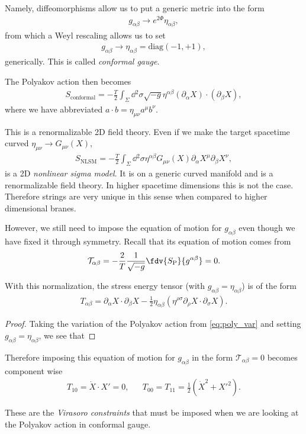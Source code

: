 Namely, diffeomorphisms allow us to put a generic metric into the form
\begin{align}
    g_{\alpha \beta} \to e^{2 \Phi} \eta_{\alpha \beta}
,\end{align}
from which a Weyl rescaling allows us to set
\begin{align}
    g_{\alpha \beta} \to \eta_{\alpha \beta} = \text{diag}\left( -1,+1 \right) 
,\end{align}
generically. This is called \emph{conformal gauge}. 

The Polyakov action then becomes
\begin{align}
    S_\text{conformal} = -\frac{T}{2} \int_{\Sigma} \dd{^2\sigma} \sqrt{-g}  \eta^{\alpha \beta} \left( \partial_\alpha X \right)  \cdot \left( \partial_\beta X \right) 
,\end{align}
where we have abbreviated $a\cdot b = \eta_{\mu \nu} a^{\mu} b^{\nu}$.

This is a renormalizable 2D field theory. Even if we make the target spacetime curved $\eta_{\mu \nu} \to G_{\mu \nu} \left( X \right) $,
\begin{align}
    S_\text{NLSM} = -\frac{T}{2} \int_{\Sigma} \dd{^2\sigma} \eta^{\alpha \beta} G_{\mu \nu} \left( X \right) \partial_\alpha X^{\mu} \partial_\beta X^{\nu}
,\end{align}
is a 2D \emph{nonlinear sigma model}. It is on a generic curved manifold and is a renormalizable field theory. In higher spacetime dimensions this is not the case. Therefore strings are very unique in this sense when compared to higher dimensional branes.

However, we still need to impose the equation of motion for $g_{\alpha \beta}$ even though we have fixed it through symmetry. Recall that its equation of motion comes from
\begin{align}
    \mathcal{T}_{\alpha \beta} = -\frac{2}{T} \frac{1}{\sqrt{-g}}  \fdv{S_\text{P}}{g^{\alpha \beta}} = 0
.\end{align}

With this normalization, the stress energy tensor (with $g_{\alpha \beta} = \eta_{\alpha \beta}$) is of the form
\begin{align}
    T_{\alpha \beta} = \partial_\alpha X \cdot \partial_\beta X - \frac{1}{2} \eta_{\alpha \beta} \left( \eta^{\rho \sigma} \partial_\rho X \cdot \partial_\sigma X \right) 
.\end{align}

\begin{proof}
    Taking the variation of the Polyakov action from \cref{eq:poly_var} and setting $g_{\alpha \beta} = \eta_{\alpha \beta}$, we see that
\end{proof}

Therefore imposing this equation of motion for $g_{\alpha \beta}$ in the form $\mathcal{T}_{\alpha \beta} = 0$ becomes component wise
\begin{align}
    T_{10} = \dot{X} \cdot X' = 0, && T_{00} = T_{11} = \frac{1}{2} \left( \dot{X}^2 + X'^2 \right) 
.\end{align}

These are the \emph{Virasoro constraints} that must be imposed when we are looking at the Polyakov action in conformal gauge.


